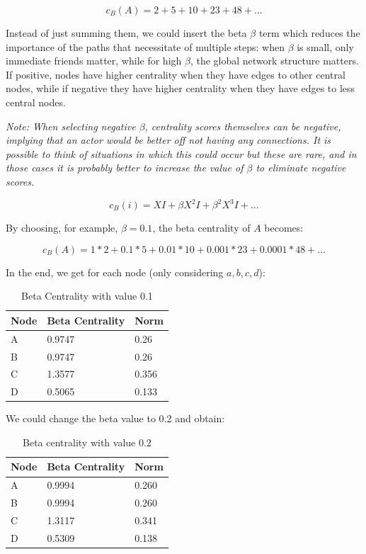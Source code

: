 \documentclass[
  notitlepage,
  onecolumn,
  openany]{book}
\begin{document}
\[
c_B(A) = 2+5+10+23+48+\dots
\]

Instead of just summing them, we could insert the beta \(\beta\) term which reduces the importance of the paths that necessitate of multiple steps: when \(\beta\) is small, only immediate friends matter, while for high \(\beta\), the global network structure matters. If positive, nodes have higher centrality when they have edges to other central nodes, while if negative they have higher centrality when they have edges to less central nodes.

\emph{Note: When selecting negative \(\beta\), centrality scores themselves can be negative, implying that an actor would be better off not having any connections. It is possible to think of situations in which this could occur but these are rare, and in those cases it is probably better to increase the value of \(\beta\) to eliminate negative scores.}

\[
c_B(i) = XI+\beta X^2I+\beta^2X^3I+\dots
\]

By choosing, for example, \(\beta = 0.1\), the beta centrality of \(A\) becomes:

\[
c_B(A) = 1*2+0.1*5+0.01*10+0.001*23+0.0001*48+\dots
\]

In the end, we get for each node (only considering \(a,b,c,d\)):

\begin{table}[h]
\centering
\begin{tabular}{@{}lll@{}}
\toprule
\textbf{Node} & \textbf{Beta Centrality} & \textbf{Norm} \\ \midrule
A             & 0.9747                   & 0.26          \\
B             & 0.9747                   & 0.26          \\
C             & 1.3577                   & 0.356         \\
D             & 0.5065                   & 0.133         \\ \bottomrule
\end{tabular}
\caption{Beta Centrality with \beta value 0.1}
\label{tab:my-table}
\end{table}

We could change the beta value to 0.2 and obtain:

\begin{table}[h]
\centering
\begin{tabular}{@{}lll@{}}
\toprule
\textbf{Node} & \textbf{Beta Centrality} & \textbf{Norm} \\ \midrule
A             & 0.9994                   & 0.260         \\
B             & 0.9994                   & 0.260         \\
C             & 1.3117                   & 0.341         \\
D             & 0.5309                   & 0.138         \\ \bottomrule
\end{tabular}
\caption{Beta centrality with \beta value 0.2}
\label{tab:my-table}
\end{table}
\end{document}
